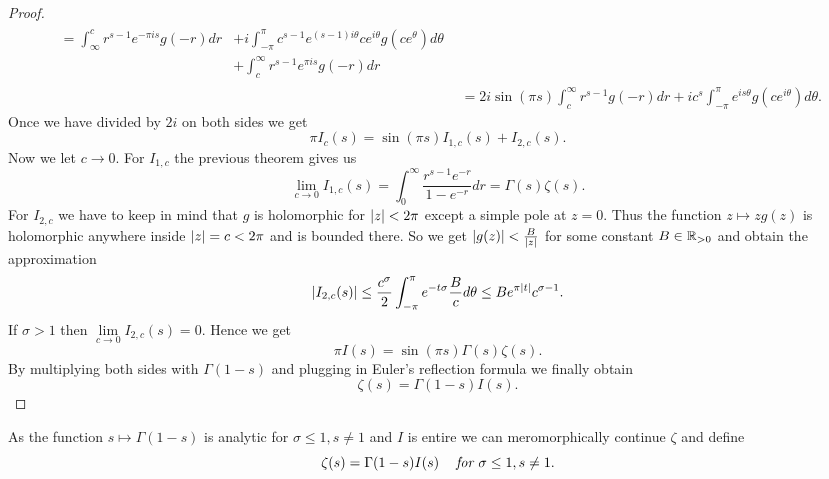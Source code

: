 \begin{proof}
\begin{equation*}
\begin{aligned}
\begin{aligned}
		= \int _\infty ^c r^{s - 1} e^{-\pi i s} g(-r) dr
		&+ i \int _{-\pi} ^{\pi} c^{s - 1} e^{(s - 1) i \theta} c e^{i \theta} g(c e^\theta) d\theta \\ 
		&+ \int _{c} ^\infty r^{s - 1} e^{\pi i s} g(-r) dr
	\end{aligned} \\
	&= 2 i \sin(\pi s) \int _c ^\infty r^{s - 1} g(-r) dr + i c^s \int _{-\pi} ^\pi e^{i s \theta} g(c e^{i \theta}) d\theta.
\end{aligned}
\end{equation*}
	Once we have divided by $2i$ on both sides we get
\begin{equation*}
	\pi I_c(s) = \sin(\pi s)I_{1, c}(s) + I_{2, c}(s).
\end{equation*}
	Now we let $c \to 0$. For $I_{1, c}$ the previous theorem gives us
\begin{equation*}
	\lim\limits _{c \to 0} I_{1, c}(s) = \int _0 ^\infty \frac{r^{s - 1} e^{-r}}{1 - e^{-r}} dr = \Gamma(s)\zeta(s).
\end{equation*}
	For $I_{2, c}$ we have to keep in mind that $g$ is holomorphic for $\left|z\right| < 2 \pi$ except a simple pole at $z = 0$. Thus the function $z \mapsto z g(z)$ is holomorphic anywhere inside $\left|z\right| = c < 2 \pi$ and is bounded there. So we get $\left|g(z)\right| < \frac{B}{\left|z\right|}$ for some constant $B \in \mathbb{R}_{> 0}$ and obtain the approximation
\begin{equation*}
	\left|I_{2, c}(s)\right| \leq \frac{c^\sigma}{2} \int _{-\pi} ^{\pi} e^{-t \sigma} \frac{B}{c} d\theta \leq B e^{\pi \left|t\right|} c^{\sigma - 1}.
\end{equation*}
	If $\sigma > 1$ then $\lim\limits _{c \to 0} I_{2, c}(s) = 0$. Hence we get
\begin{equation*}
	\pi I(s) = \sin(\pi s) \Gamma(s)\zeta(s).
\end{equation*}
	By multiplying both sides with $\Gamma(1 - s)$ and plugging in Euler's reflection formula we finally obtain
\begin{equation*}
	\zeta(s) = \Gamma(1 - s) I(s).
\end{equation*}
\end{proof}


\begin{definition}
	As the function $s \mapsto \Gamma(1 - s)$ is analytic for $\sigma \leq 1, s \neq 1$ and $I$ is entire we can meromorphically continue $\zeta$ and define 
\begin{equation*}
	\zeta(s) = \Gamma(1 - s) I(s) \hspace{0.3cm} \textit{ for } \sigma \leq 1, s \neq 1.
\end{equation*}
\end{definition}


